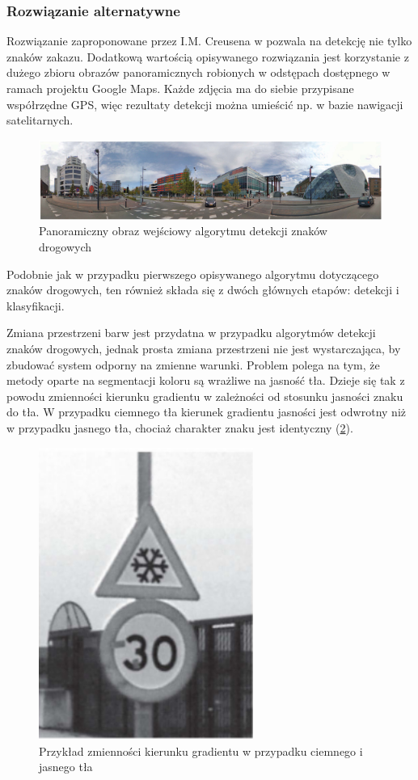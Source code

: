 \subsubsection{Rozwiązanie alternatywne}
Rozwiązanie zaproponowane przez I.M. Creusena w \cite{T7} pozwala na detekcję nie tylko znaków zakazu. Dodatkową wartością opisywanego rozwiązania jest korzystanie z dużego zbioru obrazów panoramicznych robionych w odstępach dostępnego w ramach projektu Google Maps. Każde zdjęcia ma do siebie przypisane współrzędne GPS, więc rezultaty detekcji można umieścić np. w bazie nawigacji satelitarnych.

\begin{figure}
  \centering
  \includegraphics[width=13cm]{img/sign_detection2_input.png}
  \caption{Panoramiczny obraz wejściowy algorytmu detekcji znaków drogowych\cite{T7}}
  \label{fig:sign_detection2_input}
\end{figure}

Podobnie jak w przypadku pierwszego opisywanego algorytmu dotyczącego znaków drogowych, ten również składa się z dwóch głównych etapów: detekcji i klasyfikacji.

Zmiana przestrzeni barw jest przydatna w przypadku algorytmów detekcji znaków drogowych, jednak prosta zmiana przestrzeni nie jest wystarczająca, by zbudować system odporny na zmienne warunki. Problem polega na tym, że metody oparte na segmentacji koloru są wrażliwe na jasność tła. Dzieje się tak z powodu zmienności kierunku gradientu w zależności od stosunku jasności znaku do tła. W przypadku ciemnego tła kierunek gradientu jasności jest odwrotny niż w przypadku jasnego tła, chociaż charakter znaku jest identyczny (\ref{fig:sign_detection2_example}).

\begin{figure}
  \centering
  \includegraphics[width=7cm]{img/sign_detection2_example.png}
  \caption{Przykład zmienności kierunku gradientu w przypadku ciemnego i jasnego tła\cite{T7}}
  \label{fig:sign_detection2_example}
\end{figure}

